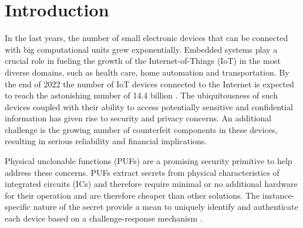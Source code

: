 \chapter{Introduction}


In the last years, the number of small electronic devices that can be connected with big computational units grew exponentially. Embedded systems play a crucial role in fueling the growth of the Internet-of-Things (IoT) in the most diverse domains, such as health care, home automation and transportation. By the end of 2022 the number of IoT devices connected to the Internet is expected to reach the astonishing number of 14.4 billion \cite{IoT_state}. The ubiquitousness of such devices coupled with their ability to access potentially sensitive and confidential information has given rise to security and privacy concerns. An additional challenge is the growing number of counterfeit
components in these devices, resulting in serious reliability and financial implications.

Physical unclonable functions (PUFs) are a promising security primitive to help address these concerns.  PUFs extract secrets from physical characteristics of integrated circuits (ICs)  \cite{PUF_IEEE_Herder} and therefore require minimal or no additional hardware for their operation and are therefore cheaper than other solutions. The instance-specific nature of the secret provide a mean to uniquely identify and authenticate each device based on a challenge-response mechanism \cite{PUF_Sutar}.

